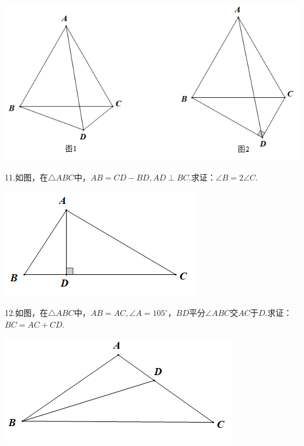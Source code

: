 \documentclass[10pt]{ctexart}
\begin{document}
\begin{center}
	\includegraphics[scale=0.6]{figure/jiechangbuduan14}
\end{center}

\begin{shaded}
	11.如图，在$\triangle ABC$中，$AB=CD-BD,AD\perp BC$.求证：$\angle B=2\angle C$.
\end{shaded}

\begin{flushright}
	\includegraphics[scale=0.6]{figure/jiechangbuduan15}
\end{flushright}

\begin{shaded}
	12.如图，在$\triangle ABC$中，$AB=AC,∠A=105^\circ$，$BD$平分$\angle ABC$交$AC$于$D$.求证：$BC=AC+CD$.
\end{shaded}

\begin{flushright}
	\includegraphics[scale=0.6]{figure/jiechangbuduan16}
\end{flushright}
\end{document}
